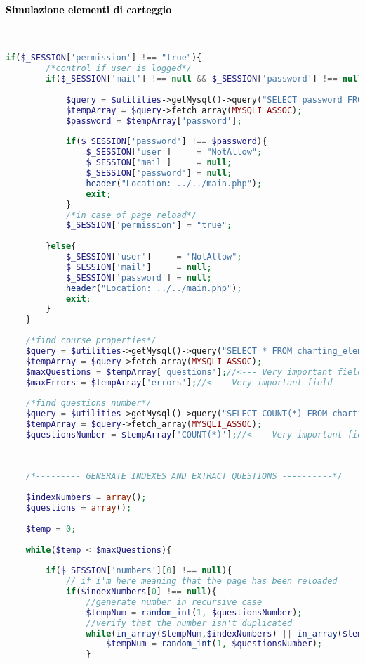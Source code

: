 \paragraph{\textcolor{black}{Simulazione elementi di carteggio}}\leavevmode\\
\raggedright
\begin{lstlisting}[language=php]
	if($_SESSION['permission'] !== "true"){
		/*control if user is logged*/
		if($_SESSION['mail'] !== null && $_SESSION['password'] !== null){
			
			$query = $utilities->getMysql()->query("SELECT password FROM user_table1 WHERE (email = '{$_SESSION['mail']}')");
			$tempArray = $query->fetch_array(MYSQLI_ASSOC);
			$password = $tempArray['password'];
			
			if($_SESSION['password'] !== $password){
				$_SESSION['user']     = "NotAllow";
				$_SESSION['mail']     = null;
				$_SESSION['password'] = null;
				header("Location: ../../main.php");
				exit;
			}
			/*in case of page reload*/
			$_SESSION['permission'] = "true";
			
		}else{
			$_SESSION['user']     = "NotAllow";
			$_SESSION['mail']     = null;
			$_SESSION['password'] = null;
			header("Location: ../../main.php");
			exit;
		}
	}
	
	/*find course properties*/
	$query = $utilities->getMysql()->query("SELECT * FROM charting_elements_properties WHERE (id = '1')");
	$tempArray = $query->fetch_array(MYSQLI_ASSOC);
	$maxQuestions = $tempArray['questions'];//<--- Very important field
	$maxErrors = $tempArray['errors'];//<--- Very important field
	
	/*find questions number*/
	$query = $utilities->getMysql()->query("SELECT COUNT(*) FROM charting_elements");
	$tempArray = $query->fetch_array(MYSQLI_ASSOC);
	$questionsNumber = $tempArray['COUNT(*)'];//<--- Very important field
	
	
	
	/*--------- GENERATE INDEXES AND EXTRACT QUESTIONS ----------*/
	
	$indexNumbers = array();
	$questions = array();
	
	$temp = 0;
	
	while($temp < $maxQuestions){
		
		if($_SESSION['numbers'][0] !== null){
			// if i'm here meaning that the page has been reloaded     
			if($indexNumbers[0] !== null){
				//generate number in recursive case
				$tempNum = random_int(1, $questionsNumber);
				//verify that the number isn't duplicated
				while(in_array($tempNum,$indexNumbers) || in_array($tempNum,$_SESSION['numbers'])){
					$tempNum = random_int(1, $questionsNumber);
				}
				

\end{lstlisting}
